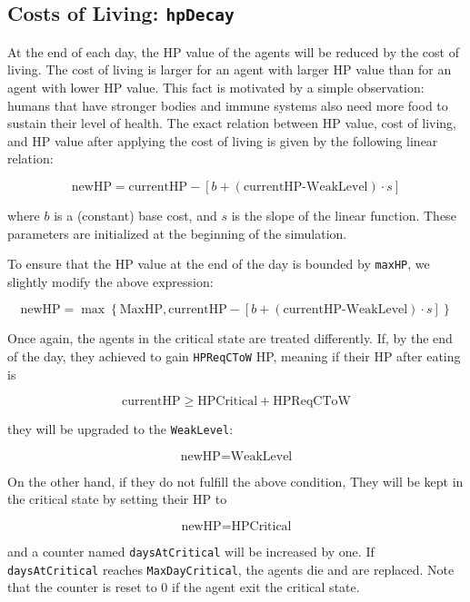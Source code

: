 %
%
\subsection{Costs of Living: \texttt{hpDecay}}\label{hpDecay}
At the end of each day, the HP value of the agents will be reduced by the cost of living. The cost of living is larger for an agent with larger HP value than for an agent with lower HP value. This fact is motivated by a simple observation: humans that have stronger bodies and immune systems also need more food to sustain their level of health. The exact relation between HP value, cost of living, and HP value after applying the cost of living is given by the following linear relation:

\begin{equation}\label{hpDecay}
    \text{newHP} = \text{currentHP}-\left[b + (\text{currentHP-WeakLevel})\cdot s\right]
\end{equation}


where $b$ is a (constant) base cost, and $s$ is the slope of the linear function. These parameters are initialized at the beginning of the simulation. 

To ensure that the HP value at the end of the day is bounded by \texttt{maxHP}, we slightly modify the above expression:

\begin{equation}\label{hpDecay_bounded}
    \text{newHP} =\max\left\{\text{MaxHP}, \text{currentHP}-\left[b + (\text{currentHP-WeakLevel})\cdot s\right]\right\}
\end{equation}

Once again, the agents in the critical state are treated differently. If, by the end of the day, they achieved to gain \texttt{HPReqCToW} HP, meaning if their HP after eating is

\begin{equation}\label{HPReqCToW}
    \text{currentHP} \geq \text{HPCritical}+\text{HPReqCToW}
\end{equation}

they will be upgraded to the \texttt{WeakLevel}:

\begin{equation}\label{hpDecay_critical_upgrade}
    \text{newHP} = \text{WeakLevel}
\end{equation}

On the other hand, if they do not fulfill the above condition, They will be kept in the critical state by setting their HP to

\begin{equation}\label{hpDecay_critical_stay}
    \text{newHP} = \text{HPCritical}
\end{equation}

and a counter named \texttt{daysAtCritical} will be increased by one. If \texttt{daysAtCritical} reaches \texttt{MaxDayCritical}, the agents die and are replaced. Note that the counter is reset to 0 if the agent exit the critical state.
